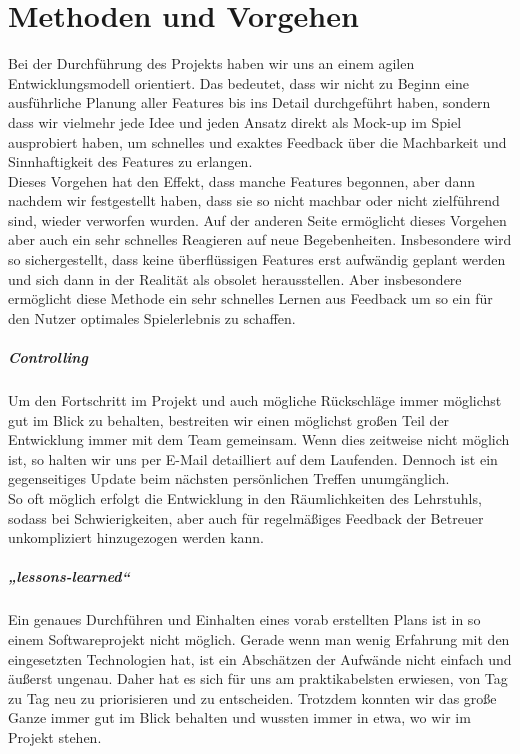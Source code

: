 \chapter{Methoden und Vorgehen}
Bei der Durchführung des Projekts haben wir uns an einem agilen Entwicklungsmodell orientiert. Das bedeutet, dass wir nicht zu Beginn eine ausführliche Planung aller Features bis ins Detail durchgeführt haben, sondern dass wir vielmehr jede Idee und jeden Ansatz direkt als Mock-up im Spiel ausprobiert haben, um schnelles und exaktes Feedback über die Machbarkeit und Sinnhaftigkeit des Features zu erlangen.\\
Dieses Vorgehen hat den Effekt, dass manche Features begonnen, aber dann nachdem wir festgestellt haben, dass sie so nicht machbar oder nicht zielführend sind, wieder verworfen wurden. Auf der anderen Seite ermöglicht dieses Vorgehen aber auch ein sehr schnelles Reagieren auf neue Begebenheiten. Insbesondere wird so sichergestellt, dass keine überflüssigen Features erst aufwändig geplant werden und sich dann in der Realität als obsolet herausstellen. Aber insbesondere ermöglicht diese Methode ein sehr schnelles Lernen aus Feedback um so ein für den Nutzer optimales Spielerlebnis zu schaffen.\\
\paragraph{Controlling}\noindent
Um den Fortschritt im Projekt und auch mögliche Rückschläge immer möglichst gut im Blick zu behalten, bestreiten wir einen möglichst großen Teil der Entwicklung immer mit dem Team gemeinsam. Wenn dies zeitweise nicht möglich ist, so halten wir uns per E-Mail detailliert auf dem Laufenden. Dennoch ist ein gegenseitiges Update beim nächsten persönlichen Treffen unumgänglich.\\
So oft möglich erfolgt die Entwicklung in den Räumlichkeiten des Lehrstuhls, sodass bei Schwierigkeiten, aber auch für regelmäßiges Feedback der Betreuer unkompliziert hinzugezogen werden kann.
\paragraph{„lessons-learned“}\noindent
Ein genaues Durchführen und Einhalten eines vorab erstellten Plans ist in so einem Softwareprojekt nicht möglich. Gerade wenn man wenig Erfahrung mit den eingesetzten Technologien hat, ist ein Abschätzen der Aufwände nicht einfach und äußerst ungenau. Daher hat es sich für uns am praktikabelsten erwiesen, von Tag zu Tag neu zu priorisieren und zu entscheiden. Trotzdem konnten wir das große Ganze immer gut im Blick behalten und wussten immer in etwa, wo wir im Projekt stehen.